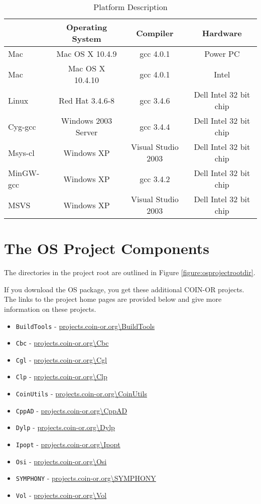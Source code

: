 \documentclass[11pt]{article}
\newcounter{Fig}
\renewcommand{\_}{{\char"5F}}
\renewcommand{\{}{{\char"7B}}
\renewcommand{\}}{{\char"7D}}
\renewcommand{\^}{{\char"0D}}
\renewcommand{\'}{{\char"0D}}
\begin{document}
 \begin{table}
\caption{Platform Description}
\centering
\label{table:platformdescription}
\vskip 8pt
 \begin{tabular}{l|c|c|c|}
 & {\bf Operating System} & {\bf Compiler} & {\bf  Hardware} \\ \hline
 Mac &Mac OS X 10.4.9&gcc 4.0.1&Power PC \\   \hline
  Mac &Mac OS X 10.4.10&gcc 4.0.1&Intel \\   \hline
 Linux &Red Hat 3.4.6-8&gcc 3.4.6& Dell Intel 32 bit chip\\ \hline
 Cyg-gcc &Windows 2003 Server&gcc 3.4.4& Dell Intel 32 bit chip \\ \hline
 Msys-cl &Windows XP&Visual Studio 2003 &Dell Intel 32 bit chip \\ \hline
 MinGW-gcc &Windows XP&gcc 3.4.2&Dell Intel 32 bit chip \\ \hline
 MSVS &Windows XP&Visual Studio 2003 &Dell Intel 32 bit chip \\ \hline
\end{tabular}
\end{table}


\section{The OS Project Components}\label{section:projectcomponents}

The directories in the  project root  are outlined in Figure  \ref{figure:osprojectrootdir}.

If you download the OS package, you get these additional COIN-OR projects. The links to the project home pages are provided below and give more information on these projects.
\begin{itemize}
\item {\tt BuildTools} - \url{projects.coin-or.org\BuildTools}
\item {\tt Cbc} - \url{projects.coin-or.org\Cbc}
\item {\tt Cgl} - \url{projects.coin-or.org\Cgl}
\item {\tt Clp}  - \url{projects.coin-or.org\Clp}
\item {\tt CoinUtils} - \url{projects.coin-or.org\CoinUtils}
\item {\tt CppAD} - \url{projects.coin-or.org\CppAD}
\item {\tt Dylp} - \url{projects.coin-or.org\Dylp}
\item {\tt Ipopt} - \url{projects.coin-or.org\Ipopt}
\item {\tt Osi} - \url{projects.coin-or.org\Osi}
\item {\tt SYMPHONY}   - \url{projects.coin-or.org\SYMPHONY}
\item {\tt Vol}   - \url{projects.coin-or.org\Vol}
\end{itemize}
\end{document}
